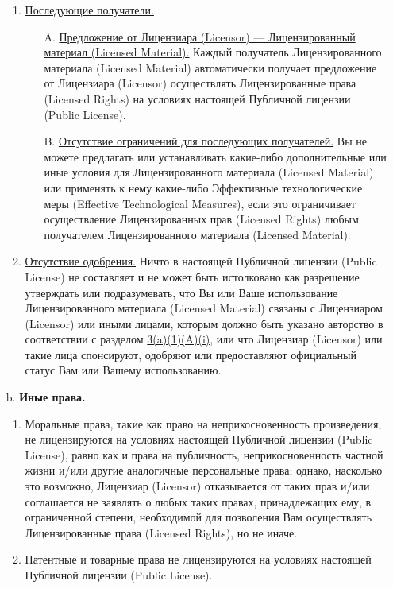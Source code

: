 \begin{itemize}
\begin{enumerate}
	\item \underline{Последующие получатели.}
		\begin{enumerate}
		\item[A.] \underline{Предложение от Лицензиара (Licensor) --- Лицензированный материал (Licensed Material).} Каждый получатель Лицензированного материала (Licensed Material) автоматически получает предложение от Лицензиара (Licensor) осуществлять Лицензированные права (Licensed Rights) на условиях настоящей Публичной лицензии (Public License).
		\item[B.] \underline{Отсутствие ограничений для последующих получателей.} Вы не можете предлагать или устанавливать какие-либо дополнительные или иные условия для Лицензированного материала (Licensed Material) или применять к нему какие-либо Эффективные технологические меры (Effective Technological Measures), если это ограничивает осуществление Лицензированных прав (Licensed Rights) любым получателем Лицензированного материала (Licensed Material).
		\end{enumerate}
\item \underline{Отсутствие одобрения.} Ничто в настоящей Публичной лицензии (Public License) не составляет и не может быть истолковано как разрешение утверждать или подразумевать, что Вы или Ваше использование Лицензированного материала (Licensed Material) связаны с Лицензиаром (Licensor) или иными лицами, которым должно быть указано авторство в соответствии с разделом \href{https://creativecommons.org/licenses/by-nc-nd/4.0/legalcode#s3a1Ai}{3(a)(1)(A)(i)}, или что Лицензиар (Licensor) или такие лица спонсируют, одобряют или предоставляют официальный статус Вам или Вашему использованию.
	\end{enumerate}
\item[b.] \textbf{Иные права.}
	\begin{enumerate}
	\item Моральные права, такие как право на неприкосновенность произведения, не лицензируются на условиях настоящей Публичной лицензии (Public License), равно как и права на публичность, неприкосновенность частной жизни и/или другие аналогичные персональные права; однако, насколько это возможно, Лицензиар (Licensor) отказывается от таких прав и/или соглашается не заявлять о любых таких правах, принадлежащих ему, в ограниченной степени, необходимой для позволения Вам осуществлять Лицензированные права (Licensed Rights), но не иначе.
	\item Патентные и товарные права не лицензируются на условиях настоящей Публичной лицензии (Public License).

\end{enumerate}
\end{itemize}
